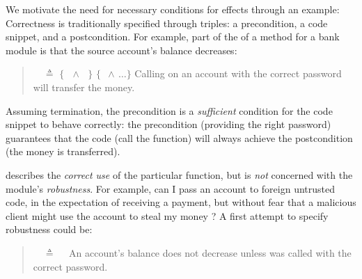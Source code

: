  We motivate the need for  necessary conditions for effects through an example:
{Correctness is} {traditionally} specified
through  triples: a  precondition, a code snippet, and a
 postcondition. 
 For example,  {part of the \funcSpec
   of a  method for a bank module is that the source account's balance decreases:}
 \begin{quote}
   \Scorrect\ \ $\triangleq$  
 {\footnotesize{ $\{\,$ $\,\wedge\,$ $\,\}$  $\{$ $\,\wedge\,\dots \}$ }} Calling  on  {an account with the correct password} will transfer the money.
\end{quote}
Assuming termination, the precondition is a \emph{sufficient} condition for the {code snippet to behave correctly}: 
the precondition (\eg providing the right 
password) guarantees that
the code (\eg call the  function)
will always achieve the postcondition (the money is transferred).
 
    \vspace{.05in}
 
\Scorrect  describes  {the \emph{correct use} of the  {particular function}, but is \emph{not} concerned with the {module's} \emph{robustness}.}
{For example, can I pass an account to foreign untrusted code, in the expectation of receiving a payment,
but without fear that a malicious client might use the account to steal my money \cite{ELang}?}
 A first  {attempt} to specify robustness could be:
 

\begin{quote}
\SrobustA\ \ $\triangleq$ \ \ An account's balance does not decrease unless  was called 
with the correct password.
\end{quote}

